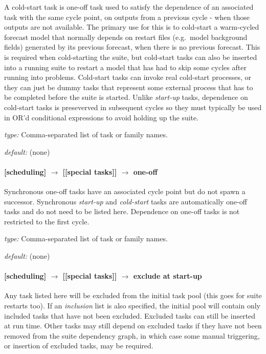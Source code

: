 A cold-start task is one-off task used to satisfy the dependence of an
associated task with the same cycle point, on outputs from a previous
cycle - when those outputs are not available.  The primary use for this
is to cold-start a warm-cycled forecast model that normally depends on
restart files (e.g.\ model background fields) generated by its previous
forecast, when there is no previous forecast.  This is required when
cold-starting the suite, but cold-start tasks can also be inserted into
a running suite to restart a model that has had to skip some cycles
after running into problems. Cold-start tasks can invoke real cold-start
processes, or they can just be dummy tasks that represent some external
process that has to be completed before the suite is started. Unlike
{\em start-up} tasks, dependence on cold-start tasks is preseverved in
subsequent cycles so they must typically be used in OR'd conditional
expressions to avoid holding up the suite.

\begin{myitemize}
    \item {\em type:} Comma-separated list of task or family names.
    \item {\em default:} (none)
\end{myitemize}

\paragraph[one-off]{[scheduling] $\rightarrow$ [[special tasks]] $\rightarrow$ one-off}

Synchronous one-off tasks have an associated cycle point but do not spawn
a successor. Synchronous {\em start-up} and {\em cold-start} tasks are
automatically one-off tasks and do not need to be listed here.
Dependence on one-off tasks is not restricted to the first cycle.

\begin{myitemize}
\item {\em type:} Comma-separated list of task or family names.
\item {\em default:} (none)
\end{myitemize}

\paragraph[exclude at start-up]{[scheduling] $\rightarrow$ [[special tasks]] $\rightarrow$ exclude at start-up}
\label{EASU}

Any task listed here will be excluded from the initial task pool (this
goes for suite restarts too). If an {\em inclusion} list is also
specified, the initial pool will contain only included tasks that have
not been excluded. Excluded tasks can still be inserted at run time.
Other tasks may still depend on excluded tasks if they have not been
removed from the suite dependency graph, in which case some manual
triggering, or insertion of excluded tasks, may be required.

